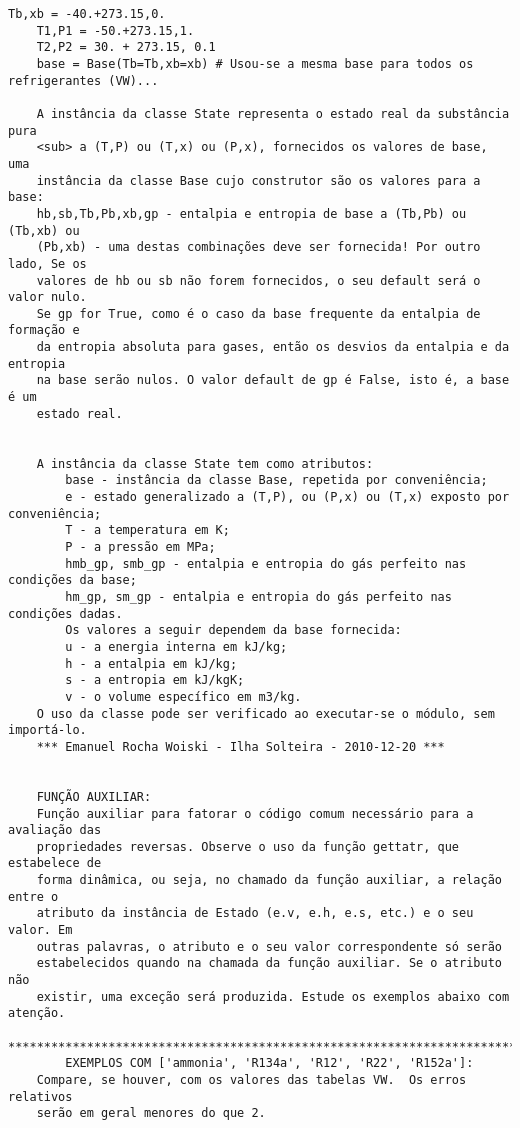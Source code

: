     \begin{Verbatim}[baselinestretch=1.0,fontsize=\scriptsize]
    Tb,xb = -40.+273.15,0.
    T1,P1 = -50.+273.15,1.
    T2,P2 = 30. + 273.15, 0.1
    base = Base(Tb=Tb,xb=xb) # Usou-se a mesma base para todos os refrigerantes (VW)...

    A instância da classe State representa o estado real da substância pura
    <sub> a (T,P) ou (T,x) ou (P,x), fornecidos os valores de base, uma
    instância da classe Base cujo construtor são os valores para a base:
    hb,sb,Tb,Pb,xb,gp - entalpia e entropia de base a (Tb,Pb) ou (Tb,xb) ou
    (Pb,xb) - uma destas combinações deve ser fornecida! Por outro lado, Se os
    valores de hb ou sb não forem fornecidos, o seu default será o valor nulo.
    Se gp for True, como é o caso da base frequente da entalpia de formação e
    da entropia absoluta para gases, então os desvios da entalpia e da entropia
    na base serão nulos. O valor default de gp é False, isto é, a base é um
    estado real.


	A instância da classe State tem como atributos:
		base - instância da classe Base, repetida por conveniência;
		e - estado generalizado a (T,P), ou (P,x) ou (T,x) exposto por conveniência;
		T - a temperatura em K;
		P - a pressão em MPa;
		hmb_gp, smb_gp - entalpia e entropia do gás perfeito nas condições da base;
		hm_gp, sm_gp - entalpia e entropia do gás perfeito nas condições dadas.
		Os valores a seguir dependem da base fornecida:
		u - a energia interna em kJ/kg;
		h - a entalpia em kJ/kg;
		s - a entropia em kJ/kgK;
		v - o volume específico em m3/kg.
	O uso da classe pode ser verificado ao executar-se o módulo, sem importá-lo.
	*** Emanuel Rocha Woiski - Ilha Solteira - 2010-12-20 ***


    FUNÇÃO AUXILIAR:
    Função auxiliar para fatorar o código comum necessário para a avaliação das
    propriedades reversas. Observe o uso da função gettatr, que estabelece de
    forma dinâmica, ou seja, no chamado da função auxiliar, a relação entre o
    atributo da instância de Estado (e.v, e.h, e.s, etc.) e o seu valor. Em
    outras palavras, o atributo e o seu valor correspondente só serão
    estabelecidos quando na chamada da função auxiliar. Se o atributo não
    existir, uma exceção será produzida. Estude os exemplos abaixo com atenção.
    ********************************************************************************
        EXEMPLOS COM ['ammonia', 'R134a', 'R12', 'R22', 'R152a']:
    Compare, se houver, com os valores das tabelas VW.  Os erros relativos
    serão em geral menores do que 2.


\end{Verbatim}
